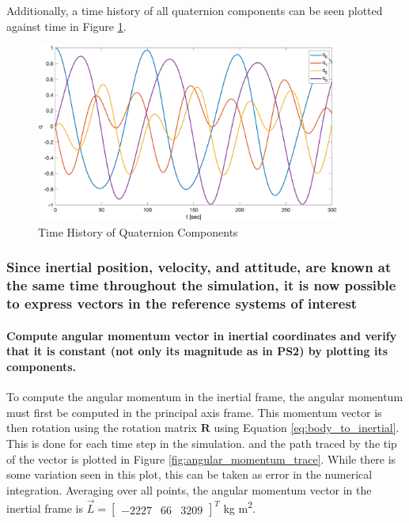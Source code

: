 Additionally, a time history of all quaternion components can be seen plotted against time in Figure \ref{fig:time_history_quaternion}. 

\begin{figure} [H]
    \centering
    \captionsetup{justification = centering}
    \includegraphics[width = 10cm] {Images/time_history_quat.png}
    \caption{Time History of Quaternion Components}
    \label{fig:time_history_quaternion}
\end{figure}

\subsubsection{Since inertial position, velocity, and attitude, are known at the same time throughout the simulation, it is now possible to express vectors in the reference systems of interest}

\paragraph{Compute angular momentum vector in inertial coordinates and verify that it is constant (not only its magnitude as in PS2) by plotting its components.} To compute the angular momentum in the inertial frame, the angular momentum must first be computed in the principal axis frame. This momentum vector is then rotation using the rotation matrix $\boldsymbol{R}$ using Equation \ref{eq:body_to_inertial}. This is done for each time step in the simulation. and the path traced by the tip of the vector is plotted in Figure \ref{fig:angular_momentum_trace}. While there is some variation seen in this plot, this can be taken as error in the numerical integration. Averaging over all points, the angular momentum vector in the inertial frame is $\vec{L} = \begin{bmatrix} -2227 & 66 & 3209 \end{bmatrix}^T$ kg m\textsuperscript{2}. 

